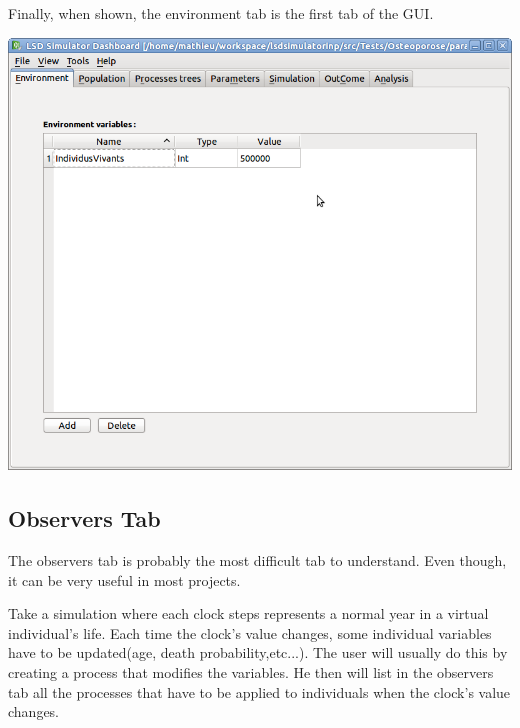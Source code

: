 \documentclass[a4paper,11pt]{report}
\begin{document}
Finally, when shown, the environment tab is the first tab of the GUI.

\begin{center}
\includegraphics[scale=0.3]{Pictures/Environment/EnvironmentTab.png}
\label{fig:envTab}
\end{center}

\subsection{Observers Tab}
The observers tab is probably the most difficult tab to understand. Even though, it can be very useful in most projects. 

Take a simulation where each clock steps represents a normal year in a virtual individual's life. Each time the clock's value changes, some individual variables have to be updated(age, death probability,etc...). The user will usually do this by creating a process that modifies the variables. He then will list in the observers tab all the processes that have to be applied to individuals when the clock's value changes.
\end{document}
